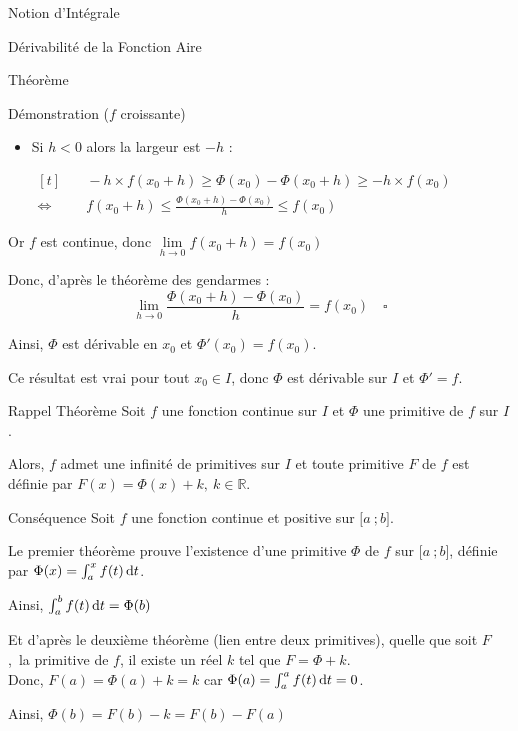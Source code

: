 \documentclass{coursbook}
\begin{document}
\begin{Gpartie}{Notion d'Intégrale}
\begin{Spartie}{Dérivabilité de la Fonction Aire}
\begin{SSpartie}{Théorème}
\begin{SSSpartie}{Démonstration \big($f$ croissante\big)}
\begin{itemize}
                        \item Si $h<0$ alors la largeur est $-h$ :
                        
                        $\begin{aligned}[t]
                            &\quad -h\times f(x_0+h)\geq\Phi(x_0)-\Phi(x_0+h)\geq -h\times f(x_0) \\
                            \iff&\quad f(x_0+h)\leq\frac{\Phi\left(x_0+h\right)-\Phi(x_0)}{h}\leq f(x_0)
                        \end{aligned}$
                    \end{itemize}
                    Or $f$ est continue, donc $\lim\limits_{h\to0}f(x_0+h)=f(x_0)$

                    Donc, d'après le théorème des gendarmes : \[\lim\limits_{h\to0}\frac{\Phi\left(x_0+h\right)-\Phi(x_0)}{h}=f(x_0)\quad\square\]

                    Ainsi, $\Phi$ est dérivable en $x_0$ et $\Phi'(x_0)=f(x_0)$.

                    Ce résultat est vrai pour tout $x_0\in I$, donc $\Phi$ est dérivable sur $I$ et $\Phi'=f$.
                \end{SSSpartie}
            \end{SSpartie}
            \begin{SSpartie}{Rappel Théorème} 
                Soit $f$ une fonction continue sur $I$ et $\Phi$ une primitive de $f$ sur $I$.

                Alors, $f$ admet une infinité de primitives sur $I$ et toute primitive $F$ de $f$ est définie par $F(x)=\Phi(x)+k,~k\in\mathbb{R}$.
            \end{SSpartie}
            \begin{SSpartie}{Conséquence} 
                Soit $f$ une fonction continue et positive sur $\big[a~;b\big]$.

                Le premier théorème prouve l'existence d'une primitive $\Phi$ de $f$ sur $\big[a~;b\big]$, définie par $\Phi(x)=\int_a^xf(t)\,\mathrm{d}t$.

                Ainsi, $\int_a^b f(t)\,\mathrm{d}t=\Phi(b)$

                Et d'après le deuxième théorème (lien entre deux primitives), quelle que soit $F$,~la primitive de $f$, il existe un réel $k$ tel que $F=\Phi+k$. \\ Donc, $F(a)=\Phi(a)+k=k$ car $\Phi(a)=\int_a^af(t)\,\mathrm{d}t=0$.

                Ainsi, $\Phi(b)=F(b)-k=F(b)-F(a)$


\end{SSpartie}
\end{Spartie}
\end{Gpartie}
\end{document}
